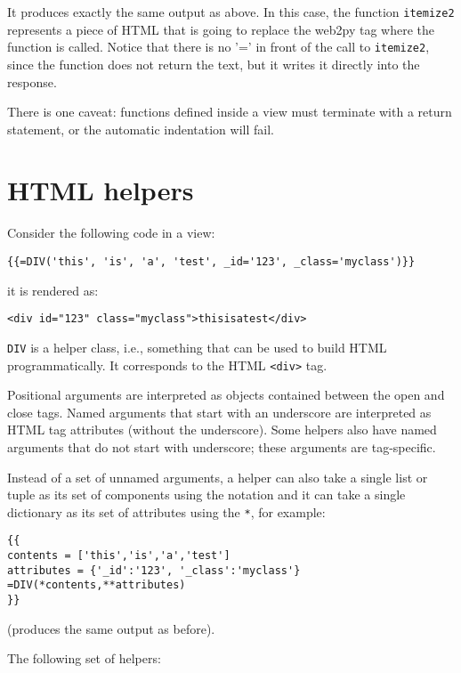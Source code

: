 \documentclass[justified,sixbynine,notoc]{tufte-book}
\def\ft{\small\tt}
\def\inxx#1{\index{#1}}
\begin{document}
\begin{fullwidth}
It produces exactly the same output as above. In this case, the function {\ft itemize2} represents a piece of HTML that is going to replace the web2py tag where the function is called. Notice that there is no '=' in front of the call to {\ft itemize2}, since the function does not return the text, but it writes it directly into the response.

There is one caveat: functions defined inside a view must terminate with a return statement, or the automatic indentation will fail.

\goodbreak\section{HTML helpers}

\inxx{helpers}

Consider the following code in a view:
\begin{lstlisting}[keywords={}]
{{=DIV('this', 'is', 'a', 'test', _id='123', _class='myclass')}}
\end{lstlisting}
\noindent it is rendered as:
\begin{lstlisting}[keywords={}]
<div id="123" class="myclass">thisisatest</div>
\end{lstlisting}
{\ft DIV} is a helper class, i.e., something that can be used to build HTML programmatically. It corresponds to the HTML {\ft <div>} tag.

Positional arguments are interpreted as objects contained between the open and close tags. Named arguments that start with an underscore are interpreted as HTML tag attributes (without the underscore). Some helpers also have named arguments that do not start with underscore; these arguments are tag-specific.

Instead of a set of unnamed arguments, a helper can also take a single list or tuple as its set of components using the {\ft *} notation and it can take a single dictionary as its set of attributes using the {\ft **}, for example:
\begin{lstlisting}[keywords={}]
{{
contents = ['this','is','a','test']
attributes = {'_id':'123', '_class':'myclass'}
=DIV(*contents,**attributes)
}}
\end{lstlisting}
(produces the same output as before).

The following set of helpers:


\end{fullwidth}
\end{document}
